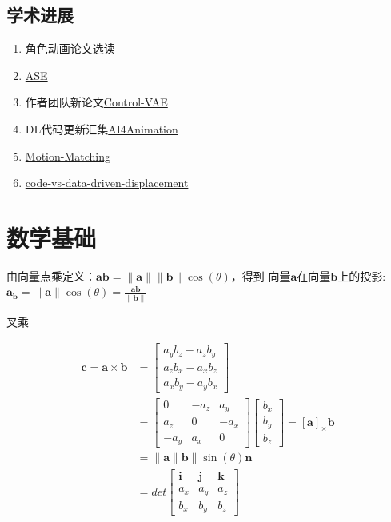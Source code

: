 \documentclass[lang=cn,newtx,10pt,scheme=chinese]{elegantbook}
\begin{document}
\section{学术进展}
\begin{enumerate}
  \item \href{https://www.zhihu.com/column/c_1061982920763293696}{角色动画论文选读}
  \item \href{https://github.com/rosswhitfield/ase}{ASE}
  \item 作者团队新论文\href{https://github.com/heyuanYao-pku/Control-VAE}{Control-VAE}\
  \item DL代码更新汇集\href{https://github.com/sebastianstarke/AI4Animation}{AI4Animation}
  \item \href{https://github.com/orangeduck/Motion-Matching}{Motion-Matching}
  \item \href{https://theorangeduck.com/page/code-vs-data-driven-displacement}{code-vs-data-driven-displacement}
\end{enumerate}

\chapter{数学基础}

由向量点乘定义：$\mathbf{ab}=\lVert \mathbf{a} \rVert  \lVert \mathbf{b} \rVert \cos(\theta)$，得到
向量$\mathbf{a}$在向量$\mathbf{b}$上的投影:$\mathbf{a}_\mathbf{b} = \lVert \mathbf{a} 
\rVert \cos(\theta) = \frac{\mathbf{ab}}{\lVert \mathbf{b} \rVert}$

叉乘

\begin{equation}
  \begin{aligned}
  \boldsymbol{c}=\boldsymbol{a} \times \boldsymbol{b} & =\left[\begin{array}{c}
  a_y b_z-a_z b_y \\
  a_z b_x-a_x b_z \\
  a_x b_y-a_y b_x
  \end{array}\right] \\
  & =\left[\begin{array}{ccc}
  0 & -a_z & a_y \\
  a_z & 0 & -a_x \\
  -a_y & a_x & 0
  \end{array}\right]\left[\begin{array}{l}
  b_x \\
  b_y \\
  b_z
  \end{array}\right]=[\boldsymbol{a}]_{\times} \boldsymbol{b}\\
  &=\|\boldsymbol{a}\|\boldsymbol{b}\| \sin (\theta) \boldsymbol{n}\\
  &=det\left[\begin{array}{ccc}
    \boldsymbol{i} & \boldsymbol{j} & \boldsymbol{k} \\
    a_x & a_y & a_z \\
    b_x & b_y & b_z
    \end{array}\right]
  \end{aligned}
\end{equation}
\end{document}
